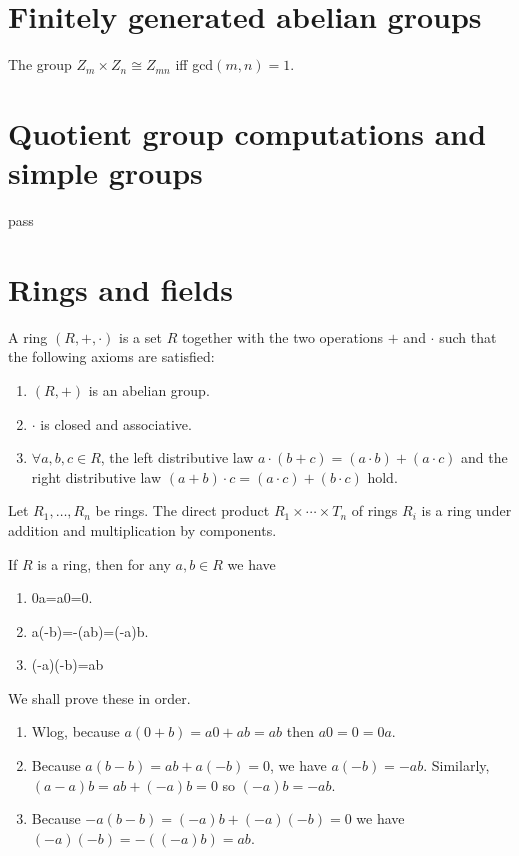 \documentclass{article}
\begin{document}
\section{Finitely generated abelian groups}
\begin{thm}
	The group \(Z_m\times Z_n\cong Z_{mn}\) iff gcd\((m,n)=1\).
\end{thm}
\section{Quotient group computations and simple groups}
\begin{defi}
	pass
\end{defi}
\section{Rings and fields}
\begin{defi}[Ring]
	A ring \((R,+,\cdot)\) is a set \(R\) together with the two operations \(+\) and \(\cdot\) such that the following axioms are satisfied:
	\begin{enumerate}
		\item \((R,+)\) is an abelian group.
		\item \(\cdot\) is closed and associative.
		\item \(\forall a,b,c\in R\), the left distributive law \(a\cdot (b+c)=(a\cdot b)+(a\cdot c)\) and the right distributive law \((a+b)\cdot c=(a\cdot c)+(b\cdot c)\) hold.
	\end{enumerate}
\end{defi}
\begin{defi}
	Let \(R_1,\ldots,R_n\) be rings. The direct product \(R_1\times\cdots\times T_n\) of rings \(R_i\) is a ring under addition and multiplication by components.
\end{defi}
\begin{thm}
	\label{ringproperties}
	If \(R\) is a ring, then for any \(a,b\in R\) we have
	\begin{enumerate}
		\item 0a=a0=0.
		\item a(-b)=-(ab)=(-a)b.
		\item (-a)(-b)=ab
	\end{enumerate}
	\begin{IEEEproof}
		We shall prove these in order.
		\begin{enumerate}
			\item Wlog, because \(a(0+b)=a0+ab=ab\) then \(a0=0=0a\).
			\item Because \(a(b-b)=ab+a(-b)=0\), we have \(a(-b)=-ab\). Similarly, \((a-a)b=ab+(-a)b=0\) so \((-a)b=-ab\).
			\item Because \(-a(b-b)=(-a)b+(-a)(-b)=0\) we have \((-a)(-b)=-((-a)b)=ab\).
		\end{enumerate}
	\end{IEEEproof}
\end{thm}
\end{document}

